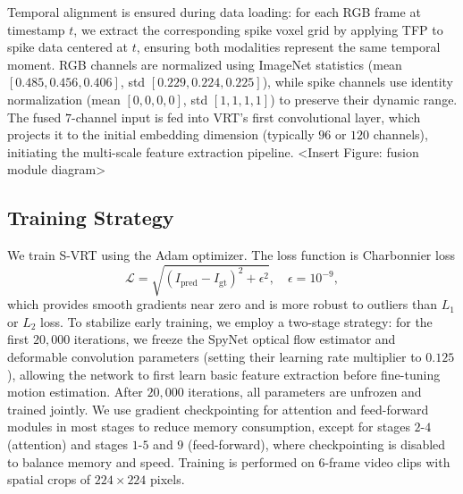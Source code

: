 \documentclass[conference]{IEEEtran}
\begin{document}
Temporal alignment is ensured during data loading: for each RGB frame at timestamp $t$, we extract the corresponding spike voxel grid by applying TFP to spike data centered at $t$, ensuring both modalities represent the same temporal moment. RGB channels are normalized using ImageNet statistics (mean $[0.485, 0.456, 0.406]$, std $[0.229, 0.224, 0.225]$), while spike channels use identity normalization (mean $[0,0,0,0]$, std $[1,1,1,1]$) to preserve their dynamic range. The fused $7$-channel input is fed into VRT's first convolutional layer, which projects it to the initial embedding dimension (typically $96$ or $120$ channels), initiating the multi-scale feature extraction pipeline.
<Insert Figure: fusion module diagram>

\subsection{Training Strategy}
We train S-VRT using the Adam optimizer. The loss function is Charbonnier loss
\begin{equation}
\mathcal{L} = \sqrt{(I_{\text{pred}} - I_{\text{gt}})^2 + \epsilon^2}, \quad \epsilon = 10^{-9},
\end{equation}
which provides smooth gradients near zero and is more robust to outliers than $L_1$ or $L_2$ loss. To stabilize early training, we employ a two-stage strategy: for the first $20,000$ iterations, we freeze the SpyNet optical flow estimator and deformable convolution parameters (setting their learning rate multiplier to $0.125$), allowing the network to first learn basic feature extraction before fine-tuning motion estimation. After $20,000$ iterations, all parameters are unfrozen and trained jointly. We use gradient checkpointing for attention and feed-forward modules in most stages to reduce memory consumption, except for stages $2$-$4$ (attention) and stages $1$-$5$ and $9$ (feed-forward), where checkpointing is disabled to balance memory and speed. Training is performed on $6$-frame video clips with spatial crops of $224 \times 224$ pixels.
\end{document}
